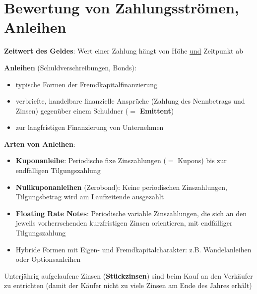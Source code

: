\section{Bewertung von Zahlungsströmen, Anleihen}

\textbf{Zeitwert des Geldes}: Wert einer Zahlung hängt von Höhe \underline{und} Zeitpunkt ab

\textbf{Anleihen} (Schuldverschreibungen, Bonds):
\begin{itemize}
	\item typische Formen der Fremdkapitalfinanzierung
	\item verbriefte, handelbare finanzielle Ansprüche (Zahlung des Nennbetrags und Zinsen) gegenüber einem Schuldner ($=$ \textbf{Emittent})
	\item zur langfristigen Finanzierung von Unternehmen
\end{itemize}
\bigskip
\textbf{Arten von Anleihen}:
\begin{itemize}
	\item \textbf{Kuponanleihe}: Periodische fixe Zinszahlungen ($=$ Kupons) bis zur endfälligen Tilgungszahlung
	\item \textbf{Nullkuponanleihen} (Zerobond): Keine periodischen Zinszahlungen, Tilgungsbetrag wird am Laufzeitende ausgezahlt
	\item \textbf{Floating Rate Notes}: Periodische variable Zinszahlungen, die sich an den jeweils vorherrschenden kurzfristigen Zinsen orientieren, mit endfälliger Tilgungszahlung
	\item Hybride Formen mit Eigen- und Fremdkapitalcharakter: z.B. Wandelanleihen oder Optionsanleihen
\end{itemize}
Unterjährig aufgelaufene Zinsen (\textbf{Stückzinsen}) sind beim Kauf an den Verkäufer zu entrichten (damit der Käufer nicht zu viele Zinsen am Ende des Jahres erhält)\\

